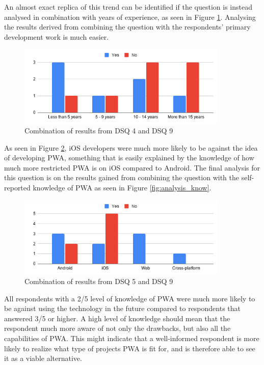 \documentclass[a4paper,12pt]{article}
\begin{document}
An almost exact replica of this trend can be identified if the question is instead analysed in combination with years of experience, as seen in Figure \ref{fig:analysis_exp}. Analysing the results derived from combining the question with the respondents' primary development work is much easier.

\begin{figure}[ht!]
    \centering
    \includegraphics[width=10cm]{img/Analysis/exp.png}
    \caption{Combination of results from DSQ 4 and DSQ 9 }
    \label{fig:analysis_exp}
\end{figure}

As seen in Figure \ref{fig:analysis_job}, iOS developers were much more likely to be against the idea of developing PWA, something that is easily explained by the knowledge of how much more restricted PWA is on iOS compared to Android. The final analysis for this question is on the results gained from combining the question with the self-reported knowledge of PWA as seen in Figure \ref{fig:analysis_know}.

\begin{figure}[ht!]
    \centering
    \includegraphics[width=10cm]{img/Analysis/job.png}
    \caption{Combination of results from DSQ 5 and DSQ 9 }
    \label{fig:analysis_job}
\end{figure}

All respondents with a 2/5 level of knowledge of PWA were much more likely to be against using the technology in the future compared to respondents that answered 3/5 or higher. A high level of knowledge should mean that the respondent much more aware of not only the drawbacks, but also all the capabilities of PWA. This might indicate that a well-informed respondent is more likely to realize what type of projects PWA is fit for, and is therefore able to see it as a viable alternative.
\end{document}
